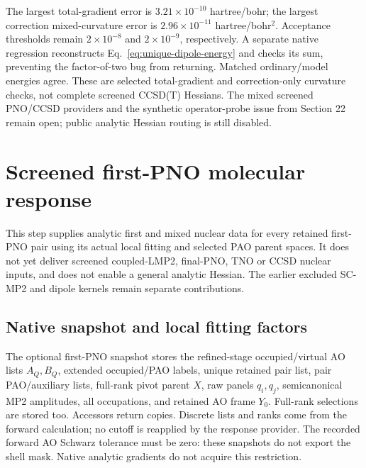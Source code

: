 \documentclass[11pt]{article}
\begin{document}
The largest total-gradient error is $3.21\times10^{-10}$ hartree/bohr;
the largest correction mixed-curvature error is $2.96\times10^{-11}$
hartree/bohr$^2$. Acceptance thresholds remain $2\times10^{-8}$ and
$2\times10^{-9}$, respectively. A separate native regression reconstructs
Eq.~\eqref{eq:unique-dipole-energy} and checks its sum, preventing the
factor-of-two bug from returning. Matched ordinary/model energies agree.
These are selected total-gradient and correction-only curvature checks,
not complete screened CCSD(T) Hessians. The mixed screened PNO/CCSD
providers and the synthetic operator-probe issue from Section 22 remain
open; public analytic Hessian routing is still disabled.

\section{Screened first-PNO molecular response}
This step supplies analytic first and mixed nuclear data for every retained
first-PNO pair using its actual local fitting and selected PAO parent spaces.
It does not yet deliver screened coupled-LMP2, final-PNO, TNO or CCSD nuclear
inputs, and does not enable a general analytic Hessian. The earlier excluded
SC-MP2 and dipole kernels remain separate contributions.

\subsection{Native snapshot and local fitting factors}
The optional first-PNO snapshot stores the refined-stage occupied/virtual
AO lists $A_Q,B_Q$, extended occupied/PAO labels, unique retained pair list,
pair PAO/auxiliary lists, full-rank pivot parent $X$, raw panels $q_i,q_j$,
semicanonical MP2 amplitudes, all occupations, and retained AO frame $Y_0$.
Full-rank selections are stored too. Accessors return copies. Discrete lists
and ranks come from the forward calculation; no cutoff is reapplied by the
response provider. The recorded forward AO Schwarz tolerance must be zero:
these snapshots do not export the shell mask. Native analytic gradients do
not acquire this restriction.
\end{document}
